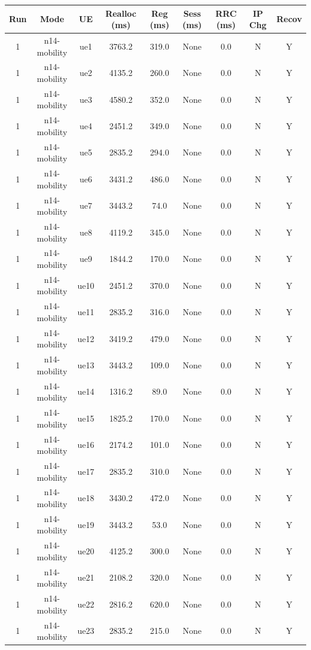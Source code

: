 \begin{table}[ht]
\centering
\begin{tabular}{|c|c|c|c|c|c|c|c|c|}
\hline
Run & Mode & UE & Realloc (ms) & Reg (ms) & Sess (ms) & RRC (ms) & IP Chg & Recov \\
\hline
1 & n14-mobility & ue1 & 3763.2 & 319.0 & None & 0.0 & N & Y \\
1 & n14-mobility & ue2 & 4135.2 & 260.0 & None & 0.0 & N & Y \\
1 & n14-mobility & ue3 & 4580.2 & 352.0 & None & 0.0 & N & Y \\
1 & n14-mobility & ue4 & 2451.2 & 349.0 & None & 0.0 & N & Y \\
1 & n14-mobility & ue5 & 2835.2 & 294.0 & None & 0.0 & N & Y \\
1 & n14-mobility & ue6 & 3431.2 & 486.0 & None & 0.0 & N & Y \\
1 & n14-mobility & ue7 & 3443.2 & 74.0 & None & 0.0 & N & Y \\
1 & n14-mobility & ue8 & 4119.2 & 345.0 & None & 0.0 & N & Y \\
1 & n14-mobility & ue9 & 1844.2 & 170.0 & None & 0.0 & N & Y \\
1 & n14-mobility & ue10 & 2451.2 & 370.0 & None & 0.0 & N & Y \\
1 & n14-mobility & ue11 & 2835.2 & 316.0 & None & 0.0 & N & Y \\
1 & n14-mobility & ue12 & 3419.2 & 479.0 & None & 0.0 & N & Y \\
1 & n14-mobility & ue13 & 3443.2 & 109.0 & None & 0.0 & N & Y \\
1 & n14-mobility & ue14 & 1316.2 & 89.0 & None & 0.0 & N & Y \\
1 & n14-mobility & ue15 & 1825.2 & 170.0 & None & 0.0 & N & Y \\
1 & n14-mobility & ue16 & 2174.2 & 101.0 & None & 0.0 & N & Y \\
1 & n14-mobility & ue17 & 2835.2 & 310.0 & None & 0.0 & N & Y \\
1 & n14-mobility & ue18 & 3430.2 & 472.0 & None & 0.0 & N & Y \\
1 & n14-mobility & ue19 & 3443.2 & 53.0 & None & 0.0 & N & Y \\
1 & n14-mobility & ue20 & 4125.2 & 300.0 & None & 0.0 & N & Y \\
1 & n14-mobility & ue21 & 2108.2 & 320.0 & None & 0.0 & N & Y \\
1 & n14-mobility & ue22 & 2816.2 & 620.0 & None & 0.0 & N & Y \\
1 & n14-mobility & ue23 & 2835.2 & 215.0 & None & 0.0 & N & Y \\

\end{tabular}
\end{table}
